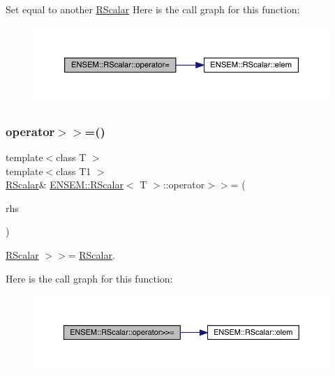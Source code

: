 Set equal to another \mbox{\hyperlink{classENSEM_1_1RScalar}{R\+Scalar}} Here is the call graph for this function\+:
\nopagebreak
\begin{figure}[H]
\begin{center}
\leavevmode
\includegraphics[width=350pt]{d0/d8c/classENSEM_1_1RScalar_a81b105339878a490866e9467135ae4fa_cgraph}
\end{center}
\end{figure}
\mbox{\label{classENSEM_1_1RScalar_a35379cd7317c2c533aa26e3c15a9b03f}} 
\subsubsection{\texorpdfstring{operator$>$$>$=()}{operator>>=()}\hspace{0.1cm}{\footnotesize\ttfamily [1/3]}}
{\footnotesize\ttfamily template$<$class T $>$ \\
template$<$class T1 $>$ \\
\mbox{\hyperlink{classENSEM_1_1RScalar}{R\+Scalar}}\& \mbox{\hyperlink{classENSEM_1_1RScalar}{E\+N\+S\+E\+M\+::\+R\+Scalar}}$<$ T $>$\+::operator$>$$>$= (\begin{DoxyParamCaption}\item[{const \mbox{\hyperlink{classENSEM_1_1RScalar}{R\+Scalar}}$<$ T1 $>$ \&}]{rhs }\end{DoxyParamCaption})\hspace{0.3cm}{\ttfamily [inline]}}



\mbox{\hyperlink{classENSEM_1_1RScalar}{R\+Scalar}} $>$$>$= \mbox{\hyperlink{classENSEM_1_1RScalar}{R\+Scalar}}. 

Here is the call graph for this function\+:
\nopagebreak
\begin{figure}[H]
\begin{center}
\leavevmode
\includegraphics[width=350pt]{d0/d8c/classENSEM_1_1RScalar_a35379cd7317c2c533aa26e3c15a9b03f_cgraph}
\end{center}
\end{figure}
\mbox{\label{classENSEM_1_1RScalar_a35379cd7317c2c533aa26e3c15a9b03f}} 
